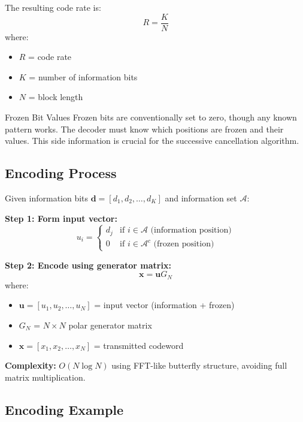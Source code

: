 The resulting code rate is:
\begin{equation}
R = \frac{K}{N}
\end{equation}
where:
\begin{itemize}
\item $R$ = code rate
\item $K$ = number of information bits
\item $N$ = block length
\end{itemize}

\begin{calloutbox}{Frozen Bit Values}
Frozen bits are conventionally set to zero, though any known pattern works. The decoder must know which positions are frozen and their values. This side information is crucial for the successive cancellation algorithm.
\end{calloutbox}

\subsection{Encoding Process}

Given information bits $\mathbf{d} = [d_1, d_2, \ldots, d_K]$ and information set $\mathcal{A}$:

\textbf{Step 1: Form input vector:}
\begin{equation}
u_i = \begin{cases}
d_j & \text{if } i \in \mathcal{A} \text{ (information position)} \\
0 & \text{if } i \in \mathcal{A}^c \text{ (frozen position)}
\end{cases}
\end{equation}

\textbf{Step 2: Encode using generator matrix:}
\begin{equation}
\mathbf{x} = \mathbf{u} G_N
\end{equation}
where:
\begin{itemize}
\item $\mathbf{u} = [u_1, u_2, \ldots, u_N]$ = input vector (information + frozen)
\item $G_N$ = $N \times N$ polar generator matrix
\item $\mathbf{x} = [x_1, x_2, \ldots, x_N]$ = transmitted codeword
\end{itemize}

\textbf{Complexity:} $O(N \log N)$ using FFT-like butterfly structure, avoiding full matrix multiplication.

\subsection{Encoding Example}

